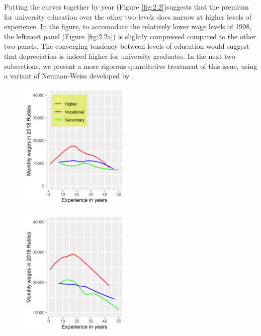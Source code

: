 \documentclass[12pt,a4paper]{article}
\numberwithin{equation}{section}
\begin{document}
Putting the curves together by year (Figure \ref{fig:2.2})suggests that the premium for university education over the other two levels does narrow at higher levels of experience. In the figure, to accomodate the relatively lower wage levels of 1998, the leftmost panel (Figure \ref{fig:2.2a}) is slightly compressed compared to the other two panels. The  converging tendency between levels of education would suggest that depreciation is indeed higher for university graduates. In the next two subsections, we present a more rigorous quantitative treatment of this issue, using a variant of Neuman-Weiss developed by \citet{murillo_172._2006}.

	
	\begin{figure}[H]
		\begin{minipage}[b]{.3\linewidth}
			\centering
			\hspace*{-0.7in}
			\includegraphics[width=150pt]{dp01_98.png}
			\label{fig:2.2a}
		\end{minipage}
		\hfill
		\begin{minipage}[b]{.3\linewidth}
			\centering
			\hspace*{-0.7in}
			\includegraphics[width=150pt]{dp01_06.png}
			\label{fig:2.2b}
		\end{minipage}
		\hfill
		\begin{minipage}[b]{.3\linewidth}

\end{minipage}
\end{figure}
\end{document}
